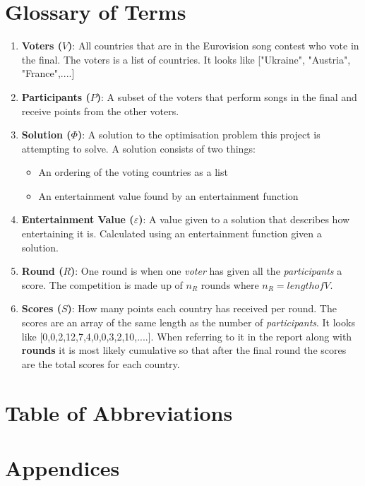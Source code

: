 \documentclass[12pt]{report}
\begin{document}
\section*{Glossary of Terms}
\begin{enumerate}
\item \textbf{Voters ($V$)}: All countries that are in the Eurovision song contest who vote in the final. The voters is a list of countries. It looks like ["Ukraine", "Austria", "France",....]
\item \textbf{Participants ($P$)}: A subset of the voters that perform songs in the final and receive points from the other voters.
\item \textbf{Solution ($\Phi$)}: A solution to the optimisation problem this project is attempting to solve. A solution consists of two things:
	\begin{itemize}
		\item An ordering of the voting countries as a list
		\item An entertainment value found by an entertainment function
	\end{itemize}
\item \textbf{Entertainment Value ($\varepsilon$)}: A value given to a solution that describes how entertaining it is. Calculated using an entertainment function given a solution.
\item \textbf{Round ($R$)}: One round is when one \textit{voter} has given all the \textit{participants} a score. The competition is made up of $n_R$ rounds where $n_R = length of V$.
\item \textbf{Scores ($S$)}: How many points each country has received per round. The scores are an array of the same length as the number of \textit{participants}. It looks like [0,0,2,12,7,4,0,0,3,2,10,....]. When referring to it in the report along with \textbf{rounds} it is most likely cumulative so that after the final round the scores are the total scores for each country.
\end{enumerate}

\section*{Table of Abbreviations}

\section*{Appendices}
\end{document}
